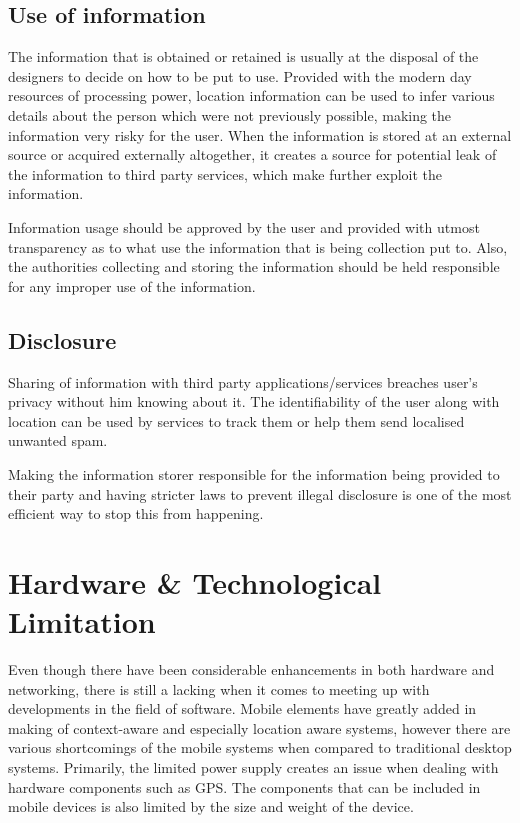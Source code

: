 \documentclass[12pt]{report}
\begin{document}
\subsection{Use of information}
The information that is obtained or retained is usually at the disposal of the designers to decide on how to be put to use. Provided with the modern day resources of processing power, location information can be used to infer various details about the person which were not previously possible, making the information very risky for the user. When the information is stored at an external source or acquired externally altogether, it creates 
a source for potential leak of the information to third party services, which make further exploit the information.

Information usage should be approved by the user and provided with utmost transparency as to what use the information that is being collection put to. Also, the authorities collecting and storing the information should be held responsible for any improper use of the information.

\subsection{Disclosure}
Sharing of information with third party applications/services breaches user's privacy without him knowing about it. The identifiability of the user along with location can be used by services to track them or help them send localised unwanted spam.

Making the information storer responsible for the information being provided to their party and having stricter laws to prevent illegal disclosure is one of the most efficient way to stop this from happening.

\section{Hardware \& Technological Limitation}
Even though there have been considerable enhancements in both hardware and networking, there is still a lacking when it comes to meeting up with developments in the field of software. Mobile elements have greatly added in making of context-aware and especially location aware systems, however there are various shortcomings of the mobile systems when compared to traditional desktop systems. Primarily, the limited power supply creates an issue when dealing with hardware components such as GPS. The components that can be included in mobile devices is also limited by the size and weight of the device.
\end{document}
